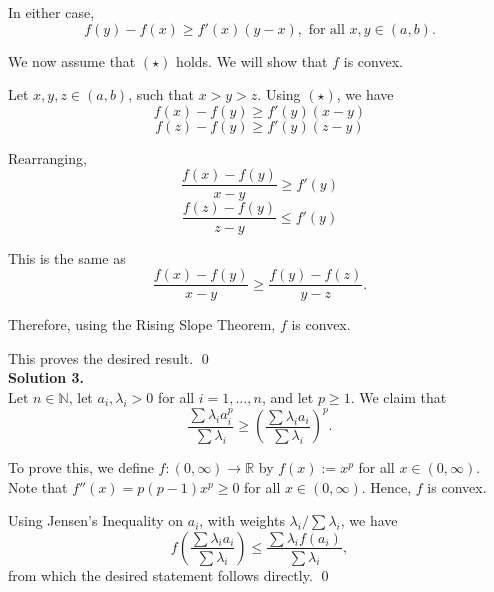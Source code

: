 \documentclass[10pt]{article}
\begin{document}
        In either case,
        \[f(y) - f(x) \ge f'(x)(y - x), \text{ for all } x, y \in (a, b).\]

        We now assume that $(\star)$ holds. We will show that $f$ is convex.

        Let $x, y, z \in (a, b)$, such that $x > y > z$.
        Using $(\star)$, we have
        \[f(x) - f(y) \ge f'(y)(x - y)\]
        \[f(z) - f(y) \ge f'(y)(z - y)\]

        Rearranging,
        \[\frac{f(x) - f(y)}{x - y} \ge f'(y)\]
        \[\frac{f(z) - f(y)}{z - y} \le f'(y)\]

        This is the same as
        \[\frac{f(x) - f(y)}{x - y} \ge \frac{f(y) - f(z)}{y - z}.\]

        Therefore, using the Rising Slope Theorem, $f$ is convex.

        This proves the desired result. \qed\\

        
        \textbf{Solution 3.}\\
        Let $n \in \mathbb{N}$, let $a_i, \lambda_i > 0$ for all $i = 1, \dotsc, n$, and let $p \ge 1$. We claim that
        \[\frac{\sum \lambda_i a_i^p}{\sum \lambda_i} \ge \left(\frac{\sum \lambda_i a_i}{\sum \lambda_i}\right)^p.\]

        To prove this, we define $f\colon (0, \infty) \to \mathbb{R}$ by $f(x) := x^p$ for all $x \in (0, \infty)$.
        Note that $f''(x) = p(p-1)x^p \ge 0$ for all $x \in (0, \infty)$. Hence, $f$ is convex.

        Using Jensen's Inequality on $a_i$, with weights $\lambda_i / \sum \lambda_i$, we have
        \[f\left(\frac{\sum\lambda_i a_i}{\sum{\lambda_i}}\right) \le \frac{\sum \lambda_i f(a_i)}{\sum \lambda_i},\]
        from which the desired statement follows directly. \qed\\
\end{document}

